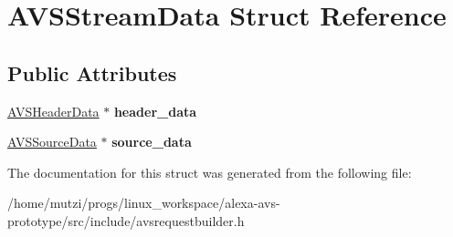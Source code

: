 \hypertarget{structAVSStreamData}{}\section{A\+V\+S\+Stream\+Data Struct Reference}
\label{structAVSStreamData}
\subsection*{Public Attributes}
\begin{DoxyCompactItemize}
\item 
\mbox{\label{structAVSStreamData_aafb2aee2c56df20d7d4f846a88142ccb}} 
\hyperlink{structAVSHeaderData}{A\+V\+S\+Header\+Data} $\ast$ {\bfseries header\+\_\+data}
\item 
\mbox{\label{structAVSStreamData_aa9aa936da39ed42facd35bdcedf99767}} 
\hyperlink{structAVSSourceData}{A\+V\+S\+Source\+Data} $\ast$ {\bfseries source\+\_\+data}
\end{DoxyCompactItemize}


The documentation for this struct was generated from the following file\+:\begin{DoxyCompactItemize}
\item 
/home/mutzi/progs/linux\+\_\+workspace/alexa-\/avs-\/prototype/src/include/avsrequestbuilder.\+h\end{DoxyCompactItemize}
